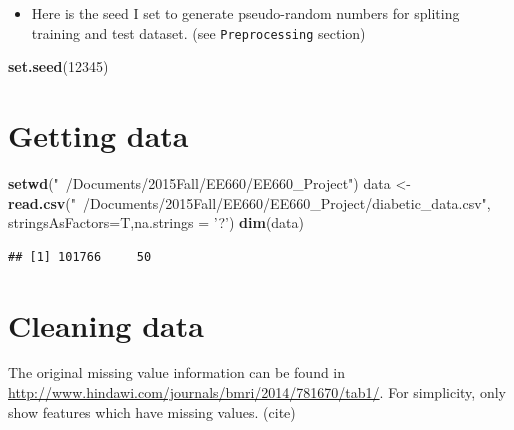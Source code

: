 \documentclass[]{article}
\newenvironment{Shaded}{\begin{snugshade}}{\end{snugshade}}
\newcommand{\KeywordTok}[1]{\textcolor[rgb]{0.13,0.29,0.53}{\textbf{{#1}}}}
\newcommand{\DataTypeTok}[1]{\textcolor[rgb]{0.13,0.29,0.53}{{#1}}}
\newcommand{\DecValTok}[1]{\textcolor[rgb]{0.00,0.00,0.81}{{#1}}}
\newcommand{\StringTok}[1]{\textcolor[rgb]{0.31,0.60,0.02}{{#1}}}
\newcommand{\NormalTok}[1]{{#1}}
\begin{document}
\begin{itemize}
\itemsep1pt\parskip0pt
\item
  Here is the seed I set to generate pseudo-random numbers for spliting
  training and test dataset. (see \texttt{Preprocessing} section)
\end{itemize}

\begin{Shaded}
\begin{Highlighting}[]
\KeywordTok{set.seed}\NormalTok{(}\DecValTok{12345}\NormalTok{)}
\end{Highlighting}
\end{Shaded}

\section{Getting data}\label{getting-data}

\begin{Shaded}
\begin{Highlighting}[]
\KeywordTok{setwd}\NormalTok{(}\StringTok{"~/Documents/2015Fall/EE660/EE660_Project"}\NormalTok{)}
\NormalTok{data <-}\StringTok{ }\KeywordTok{read.csv}\NormalTok{(}\StringTok{"~/Documents/2015Fall/EE660/EE660_Project/diabetic_data.csv"}\NormalTok{,}
                 \DataTypeTok{stringsAsFactors=}\NormalTok{T,}\DataTypeTok{na.strings =} \StringTok{'?'}\NormalTok{)}
\KeywordTok{dim}\NormalTok{(data)}
\end{Highlighting}
\end{Shaded}

\begin{verbatim}
## [1] 101766     50
\end{verbatim}

\section{Cleaning data}\label{cleaning-data}

The original missing value information can be found in
\url{http://www.hindawi.com/journals/bmri/2014/781670/tab1/}. For
simplicity, only show features which have missing values. (cite)
\end{document}
